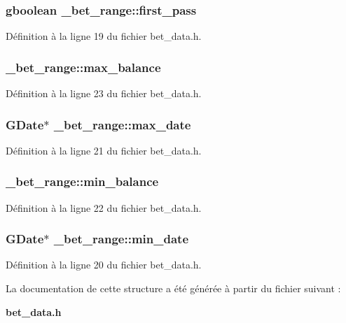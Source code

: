 \subsubsection[{first\_\-pass}]{\setlength{\rightskip}{0pt plus 5cm}gboolean {\bf \_\-bet\_\-range::first\_\-pass}}\label{struct__bet__range_a0dbb01f1c1ea61acc5bec1c441120563}


Définition à la ligne 19 du fichier bet\_\-data.h.

\subsubsection[{max\_\-balance}]{ {\bf \_\-bet\_\-range::max\_\-balance}}\label{struct__bet__range_a61dfe985728bad8ca4d781be4690fb98}


Définition à la ligne 23 du fichier bet\_\-data.h.

\subsubsection[{max\_\-date}]{\setlength{\rightskip}{0pt plus 5cm}GDate$\ast$ {\bf \_\-bet\_\-range::max\_\-date}}\label{struct__bet__range_a1b8eb0e62785339e949259edafd4baad}


Définition à la ligne 21 du fichier bet\_\-data.h.

\subsubsection[{min\_\-balance}]{ {\bf \_\-bet\_\-range::min\_\-balance}}\label{struct__bet__range_a8d990673fb6963e1b5747fccd13b3167}


Définition à la ligne 22 du fichier bet\_\-data.h.

\subsubsection[{min\_\-date}]{\setlength{\rightskip}{0pt plus 5cm}GDate$\ast$ {\bf \_\-bet\_\-range::min\_\-date}}\label{struct__bet__range_a2573f9fc9aca0d0db06c5d4f60aa4213}


Définition à la ligne 20 du fichier bet\_\-data.h.



La documentation de cette structure a été générée à partir du fichier suivant :\begin{DoxyCompactItemize}
\item 
{\bf bet\_\-data.h}\end{DoxyCompactItemize}

